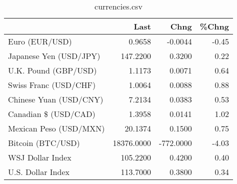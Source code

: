 \documentclass{article}%
\begin{document}
%


\begin{table}[htbp]%
\caption{currencies.csv}%
\centering%
\begin{adjustbox}{width=1\textwidth}%
\begin{tabular}{lrrr}
\toprule
                       &       Last &      Chng &  \%Chng \\
\midrule
        Euro (EUR/USD) &     0.9658 &   -0.0044 &  -0.45 \\
Japanese Yen (USD/JPY) &   147.2200 &    0.3200 &   0.22 \\
  U.K. Pound (GBP/USD) &     1.1173 &    0.0071 &   0.64 \\
 Swiss Franc (USD/CHF) &     1.0064 &    0.0088 &   0.88 \\
Chinese Yuan (USD/CNY) &     7.2134 &    0.0383 &   0.53 \\
  Canadian \$ (USD/CAD) &     1.3958 &    0.0141 &   1.02 \\
Mexican Peso (USD/MXN) &    20.1374 &    0.1500 &   0.75 \\
     Bitcoin (BTC/USD) & 18376.0000 & -772.0000 &  -4.03 \\
      WSJ Dollar Index &   105.2200 &    0.4200 &   0.40 \\
     U.S. Dollar Index &   113.7000 &    0.3800 &   0.34 \\
\bottomrule
\end{tabular}
%
\end{adjustbox}%
\end{table}

%
\end{document}
